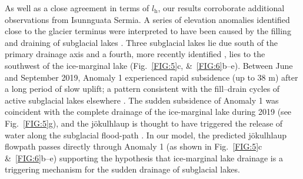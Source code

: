 \documentclass[tc, manuscript]{copernicus}
\begin{document}


As well as a close agreement in terms of $l_{\mathrm{h}}$, our results corroborate additional observations from Isunnguata Sermia. A series of elevation anomalies identified close to the glacier terminus were interpreted to have been caused by the filling and draining of subglacial lakes \citep{livingstone2019brief,livingstone2025ice}. Three subglacial lakes \citep[labelled SGL 1--3 in][]{livingstone2025ice} lie due south of the primary drainage axis \citep[Fig.~\ref{FIG:5}c, \&~\ref{FIG:6}b--e][]{livingstone2019brief} and a fourth, more recently identified \citep[labelled Anomaly 1 in][]{livingstone2025ice}, lies to the southwest of the ice-marginal lake (Fig.~\ref{FIG:5}c, \&~\ref{FIG:6}b--e). Between June and September 2019, Anomaly 1 experienced rapid subsidence (up to 38 m) after a long period of slow uplift; a pattern consistent with the fill--drain cycles of active subglacial lakes elsewhere \citep{livingstone2025ice}. The sudden subsidence of Anomaly 1 was coincident with the complete drainage of the ice-marginal lake during 2019 (see Fig.~\ref{FIG:5}g), and the jökulhlaup is thought to have triggered the release of water along the subglacial flood-path \citep{livingstone2025ice}. In our model, the predicted jökulhlaup flowpath passes directly through Anomaly 1 (as shown in Fig.~\ref{FIG:5}c \&~\ref{FIG:6}b--e) supporting the hypothesis that ice-marginal lake drainage is a triggering mechanism for the sudden drainage of subglacial lakes. 
\end{document}
